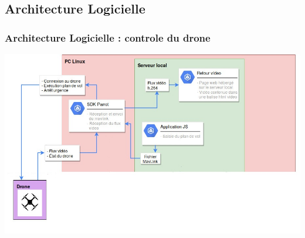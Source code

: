 \documentclass{beamer}
\begin{document}


	\begin{frame}
	\section{Architecture Logicielle}
		\begin{center}
		\frametitle{Architecture Logicielle : controle du drone}
       
        \includegraphics[scale=0.5]{Architecture_logicielle_drone.jpg}
		\end{center}
	\end{frame}
	
\end{document}
